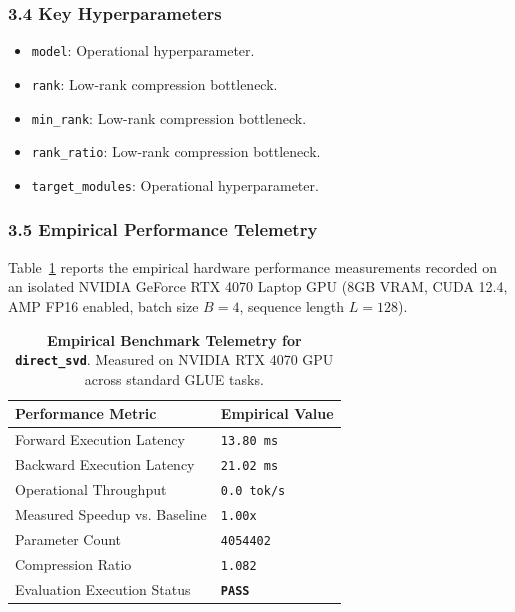 \subsubsection*{3.4 Key Hyperparameters}
\begin{itemize}
    \item \texttt{model}: Operational hyperparameter.
    \item \texttt{rank}: Low-rank compression bottleneck.
    \item \texttt{min\_rank}: Low-rank compression bottleneck.
    \item \texttt{rank\_ratio}: Low-rank compression bottleneck.
    \item \texttt{target\_modules}: Operational hyperparameter.
\end{itemize}

\subsubsection*{3.5 Empirical Performance Telemetry}
Table~\ref{tab:telemetry_direct\_svd} reports the empirical hardware performance measurements recorded on an isolated NVIDIA GeForce RTX 4070 Laptop GPU (8GB VRAM, CUDA 12.4, AMP FP16 enabled, batch size $B=4$, sequence length $L=128$).

\begin{table}[h]
\centering
\small
\caption{\textbf{Empirical Benchmark Telemetry for \texttt{direct\_svd}}. Measured on NVIDIA RTX 4070 GPU across standard GLUE tasks.}
\label{tab:telemetry_direct\_svd}
\begin{tabularx}{\columnwidth}{lX}
\toprule
\textbf{Performance Metric} & \textbf{Empirical Value} \\
\midrule
Forward Execution Latency & \texttt{13.80 ms} \\
Backward Execution Latency & \texttt{21.02 ms} \\
Operational Throughput & \texttt{0.0 tok/s} \\
Measured Speedup vs. Baseline & \texttt{1.00x} \\
Parameter Count & \texttt{4054402} \\
Compression Ratio & \texttt{1.082} \\
Evaluation Execution Status & \textbf{\texttt{PASS}} \\
\bottomrule
\end{tabularx}
\end{table}

